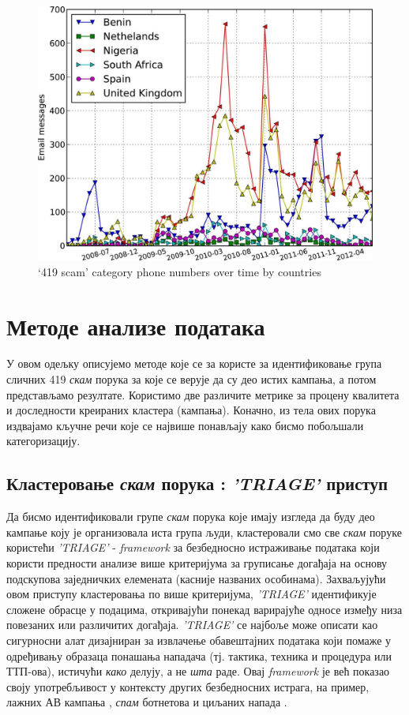 \documentclass[a4paper]{article}
\begin{document}
\begin{figure}[h!]
\begin{center}
\includegraphics[scale=0.2]{slike/2.jpg}
\end{center}
\caption{‘419 scam’ category phone numbers over time by countries}
\label{fig:slika1}
\end{figure}

\section{Методе анализе података}
У овом одељку описујемо методе које се за користе за идентификовање група сличних 419 \emph{скам} порука за које се верује да су део истих кампања, а потом представљамо резултате. Користимо две различите метрике за процену квалитета и доследности креираних кластера (кампања). Коначно, из тела ових порука издвајамо кључне речи које се највише понављају како бисмо побољшали категоризацију.

\subsection{Кластеровање \emph{скам} порука : \emph{'TRIAGE'} приступ}
Да бисмо идентификовали групе \emph{скам} порука које имају изгледа да буду део кампање коју је организовала иста група људи, кластеровали смо све \emph{скам} поруке користећи \emph{'TRIAGE'} - \emph{framework} за безбедносно истраживање података који користи предности анализе више критеријума за груписање догађаја на основу подскупова заједничких елемената (касније названих особинама). Захваљујући овом приступу кластеровања по више критеријума, \emph{'TRIAGE'} идентификује сложене обрасце у подацима, откривајући понекад варирајуће односе између низа повезаних или различитих догађаја. \emph{'TRIAGE'} се најбоље може описати као сигурносни алат дизајниран за извлачење обавештајних података који помаже у одређивању образаца понашања нападача (тј. тактика, техника и процедура или ТТП-ова), истичући \emph{како} делују, а не \emph{шта} раде. Овај \emph{framework} \cite{triage} је већ показао своју употребљивост у контексту других безбедносних истрага, на пример, лажних АВ кампања \cite{rogueav}, \emph{спам} ботнетова \cite{botnet} и циљаних напада \cite{target}.
\end{document}
